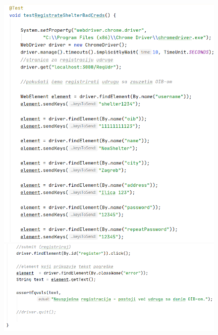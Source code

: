			 \begin{figure}[H]
			 	\includegraphics[scale=0.75]{slike/Selenium4.1.PNG}
			 	\hspace*{0.1in}
			 	\includegraphics[scale=0.75]{slike/Selenium4.2.PNG} %
			 	\centering
			 \end{figure}
		 
		 
